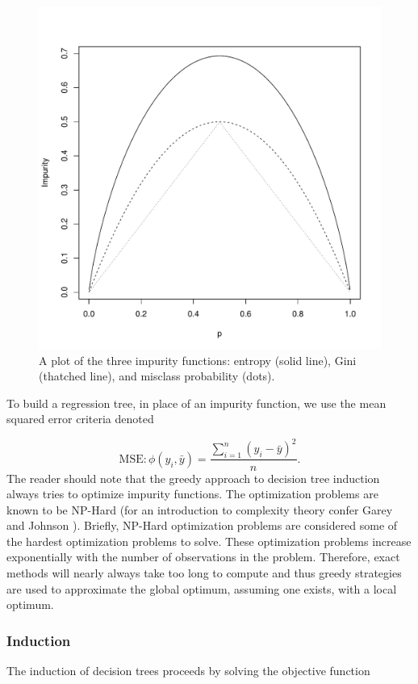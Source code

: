 \begin{figure}[H]
  \centering
  \includegraphics[scale=.7]{figures/impurity_plot.pdf}
  \caption{A plot of the three impurity functions: entropy (solid line), Gini (thatched line), and misclass probability (dots).  }
  \label{fig:impurity}
\end{figure}

To build a regression tree, in place of an impurity function, we use the mean squared error criteria denoted

$$\text{MSE}: \phi(y_i, \bar{y})=\frac{\sum_{i=1}^n(y_i-\bar{y})^2}{n}.$$
The reader should note that the greedy approach to decision tree induction always tries to optimize impurity functions. The optimization problems are known to be NP-Hard (for an introduction to complexity theory confer Garey and Johnson \cite{garey1979computers}). Briefly, NP-Hard optimization problems are considered some of the hardest optimization problems to solve. These optimization problems increase exponentially with the number of observations in the problem. Therefore, exact methods will nearly always take too long to compute and thus greedy strategies are used to approximate the global optimum, assuming one exists, with a local optimum. 
\subsubsection{Induction}
The induction of decision trees proceeds by solving the objective function

